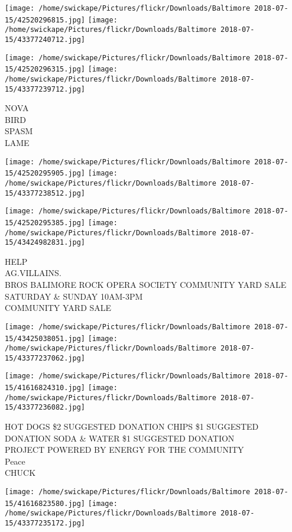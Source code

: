 \documentclass[10pt,letterpaper]{article}
\begin{document}
\texttt{[image: /home/swickape/Pictures/flickr/Downloads/Baltimore 2018-07-15/42520296815.jpg]}
\texttt{[image: /home/swickape/Pictures/flickr/Downloads/Baltimore 2018-07-15/43377240712.jpg]}

\texttt{[image: /home/swickape/Pictures/flickr/Downloads/Baltimore 2018-07-15/42520296315.jpg]}
\texttt{[image: /home/swickape/Pictures/flickr/Downloads/Baltimore 2018-07-15/43377239712.jpg]}

NOVA\\
BIRD\\
SPASM\\
LAME
\pagebreak

\texttt{[image: /home/swickape/Pictures/flickr/Downloads/Baltimore 2018-07-15/42520295905.jpg]}
\texttt{[image: /home/swickape/Pictures/flickr/Downloads/Baltimore 2018-07-15/43377238512.jpg]}

\texttt{[image: /home/swickape/Pictures/flickr/Downloads/Baltimore 2018-07-15/42520295385.jpg]}
\texttt{[image: /home/swickape/Pictures/flickr/Downloads/Baltimore 2018-07-15/43424982831.jpg]}

HELP\\
AG.VILLAINS.\\
BROS BALIMORE ROCK OPERA SOCIETY COMMUNITY YARD SALE SATURDAY \& SUNDAY 10AM{-}3PM\\
COMMUNITY YARD SALE
\pagebreak

\texttt{[image: /home/swickape/Pictures/flickr/Downloads/Baltimore 2018-07-15/43425038051.jpg]}
\texttt{[image: /home/swickape/Pictures/flickr/Downloads/Baltimore 2018-07-15/43377237062.jpg]}

\texttt{[image: /home/swickape/Pictures/flickr/Downloads/Baltimore 2018-07-15/41616824310.jpg]}
\texttt{[image: /home/swickape/Pictures/flickr/Downloads/Baltimore 2018-07-15/43377236082.jpg]}

HOT DOGS \$2 SUGGESTED DONATION CHIPS \$1 SUGGESTED DONATION SODA \& WATER \$1 SUGGESTED DONATION\\
PROJECT POWERED BY ENERGY FOR THE COMMUNITY\\
Peace\\
CHUCK
\pagebreak

\texttt{[image: /home/swickape/Pictures/flickr/Downloads/Baltimore 2018-07-15/41616823580.jpg]}
\texttt{[image: /home/swickape/Pictures/flickr/Downloads/Baltimore 2018-07-15/43377235172.jpg]}
\end{document}
